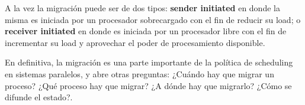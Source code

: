 \documentclass{article}
\begin{document}
A la vez la migración puede ser de dos tipos: \textbf{sender initiated} en donde la misma es iniciada por un procesador sobrecargado con el fin de reducir su load; o \textbf{receiver initiated} en donde es iniciada por un procesador libre con el fin de incrementar su load y aprovechar el poder de procesamiento disponible.

En definitiva, la migración es una parte importante de la política de scheduling en sistemas paralelos, y abre otras preguntas: ¿Cuándo hay que migrar un proceso? ¿Qué proceso hay que migrar? ¿A dónde hay que migrarlo? ¿Cómo se difunde el estado?.
\end{document}
